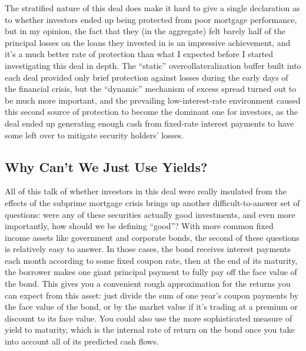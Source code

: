 \documentclass[12pt]{article}
\begin{document}
The stratified nature of this deal does make it hard to give a single declaration as to whether investors ended up being protected from poor mortgage performance, but in my opinion, the fact that they (in the aggregate) felt barely half of the principal losses on the loans they invested in is an impressive achievement, and it’s a much better rate of protection than what I expected before I started investigating this deal in depth. The “static” overcollateralization buffer built into each deal provided only brief protection against losses during the early days of the financial crisis, but the “dynamic” mechanism of excess spread turned out to be much more important, and the prevailing low-interest-rate environment caused this second source of protection to become the dominant one for investors, as the deal ended up generating enough cash from fixed-rate interest payments to have some left over to mitigate security holders’ losses. 



\subsection*{Why Can't We Just Use Yields?}

All of this talk of whether investors in this deal were really insulated from the effects of the subprime mortgage crisis brings up another difficult-to-answer set of questions: were any of these securities actually good investments, and even more importantly, how should we be defining “good”? With more common fixed income assets like government and corporate bonds, the second of these questions is relatively easy to answer. In those cases, the bond receives interest payments each month according to some fixed coupon rate, then at the end of its maturity, the borrower makes one giant principal payment to fully pay off the face value of the bond. This gives you a convenient rough approximation for the returns you can expect from this asset: just divide the sum of one year’s coupon payments by the face value of the bond, or by the market value if it’s trading at a premium or discount to its face value. You could also use the more sophisticated measure of yield to maturity, which is the internal rate of return on the bond once you take into account all of its predicted cash flows.
\end{document}
